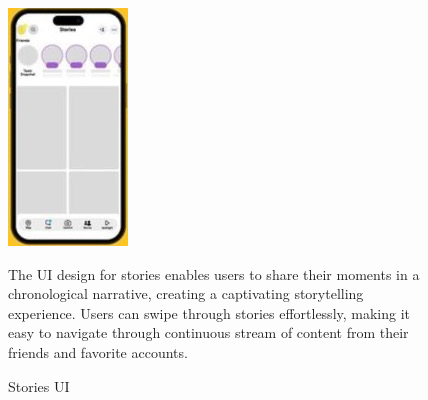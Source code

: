 \documentclass{article}
\begin{document}
\begin{figure}[h]
    \begin{minipage}{0.15\textwidth} 
        \includegraphics[width=\linewidth]{stories.jpg} 
        \caption{Stories UI}
        \label{fig:stories}
    \end{minipage}
    \begin{minipage}{0.80\textwidth} 
        The UI design for stories enables users to share their moments in a chronological narrative, creating a captivating storytelling experience. Users can swipe through stories effortlessly, making it easy to navigate through continuous stream of content from their friends and favorite accounts.
    \end{minipage}
\end{figure}
\end{document}
